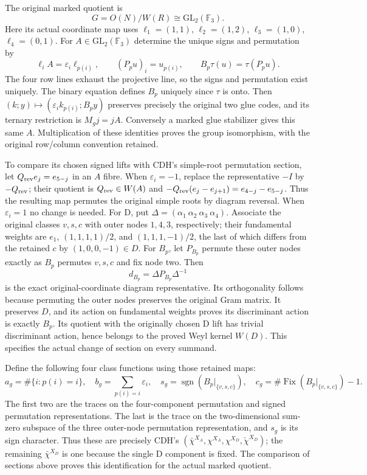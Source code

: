 The original marked quotient is
\[
 G=O(N)/W(R)\cong\mathrm{GL}_2(\mathbb F_3).
\]
Here its actual coordinate map uses
$\ell_1=(1,1)$, $\ell_2=(1,2)$, $\ell_3=(1,0)$,
$\ell_4=(0,1)$.  For $A\in\mathrm{GL}_2(\mathbb F_3)$ determine
the unique signs and permutation by
\[
 \ell_iA=\varepsilon_i\ell_{p(i)},\qquad
 (P_pu)_i=u_{p(i)},\qquad B_p\tau(u)=\tau(P_pu).
\]
The four row lines exhaust the projective line, so the signs and
permutation exist uniquely.  The binary equation defines $B_p$ uniquely
since $\tau$ is onto.  Then $(k;y)\mapsto(\varepsilon_i k_{p(i)};B_py)$
preserves precisely the original two glue codes, and its ternary
restriction is $M_gj=jA$.  Conversely a marked glue stabilizer gives this
same $A$.  Multiplication of these identities proves the group
isomorphism, with the original row/column convention retained.

To compare its chosen signed lifts with CDH's simple-root permutation
section, let $Q_{\rm rev}e_j=e_{5-j}$ in an $A$ fibre.  When
$\varepsilon_i=-1$, replace the representative $-I$ by
$-Q_{\rm rev}$; their quotient is $Q_{\rm rev}\in W(A)$ and
$-Q_{\rm rev}(e_j-e_{j+1})=e_{4-j}-e_{5-j}$.
Thus the resulting map permutes the original simple roots by diagram
reversal.  When $\varepsilon_i=1$ no change is needed.
For D, put $\Delta=(\alpha_1\ \alpha_2\ \alpha_3\ \alpha_4)$.
Associate the original classes $v,s,c$ with outer nodes $1,4,3$,
respectively; their fundamental weights are
$e_1$, $(1,1,1,1)/2$, and $(1,1,1,-1)/2$, the last of which differs
from the retained $c$ by $(1,0,0,-1)\in D$.
For $B_p$, let $P_{B_p}$ permute these outer nodes exactly as $B_p$
permutes $v,s,c$ and fix node two.  Then
\[
 d_{B_p}=\Delta P_{B_p}\Delta^{-1}
\]
is the exact original-coordinate diagram representative.  Its
orthogonality follows because permuting the outer nodes preserves the
original Gram matrix.  It preserves $D$, and its action on fundamental
weights proves its discriminant action is exactly $B_p$.
Its quotient with the originally chosen D lift has trivial discriminant
action, hence belongs to the proved Weyl kernel $W(D)$.
This specifies the actual change of section on every summand.

Define the following four class functions using those retained maps:
\[
 a_g=\#\{i:p(i)=i\},\quad
 b_g=\sum_{p(i)=i}\varepsilon_i,\quad
 s_g=\operatorname{sgn}(B_p|_{\{v,s,c\}}),\quad
 c_g=\#\operatorname{Fix}(B_p|_{\{v,s,c\}})-1.
\]
The first two are the traces on the four-component permutation and
signed permutation representations.  The last is the trace on the
two-dimensional sum-zero subspace of the three outer-node permutation
representation, and $s_g$ is its sign character.  Thus these are precisely
CDH's $(\bar\chi^{X_A},\chi^{X_A},\chi^{X_D},\check\chi^{X_D})$;
the remaining $\bar\chi^{X_D}$ is one because the single D component
is fixed.  The comparison of sections above proves this identification
for the actual marked quotient.

